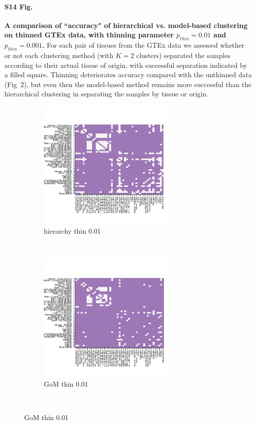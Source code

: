 \documentclass[10pt,letterpaper]{article}
\begin{document}
\paragraph*{S14 Fig.}
\label{figS14}
{\bf A comparison of ``accuracy" of hierarchical vs. model-based clustering on thinned GTEx data, with thinning parameter $p_{thin}=0.01$ and $p_{thin}=0.001$.}  For each pair of tissues from the GTEx data we assessed whether or not each clustering method (with $K=2$ clusters) separated the samples according to their actual tissue of origin, with successful separation indicated by a filled square. Thinning deteriorates accuracy compared with the unthinned data (Fig~2), but even then the model-based method remains more successful than the hierarchical clustering in separating the samples by tissue or origin.
 \begin{figure}[ht]
    \centering
     \begin{subfigure}[t]{0.5\textwidth}
        \centering
        \includegraphics[height=2.5in]{../../plots/hierarchical_separation_thinned_0_001.png}
        \caption{hierarchy thin 0.01}
    \end{subfigure}%
    ~
    \begin{subfigure}[t]{0.5\textwidth}
        \centering
        \includegraphics[height=2.5in]{../../plots/admixture_separation_thinned_0_01.png}
        \caption{GoM thin 0.01}
    \end{subfigure}\\


\end{figure}
\end{document}
